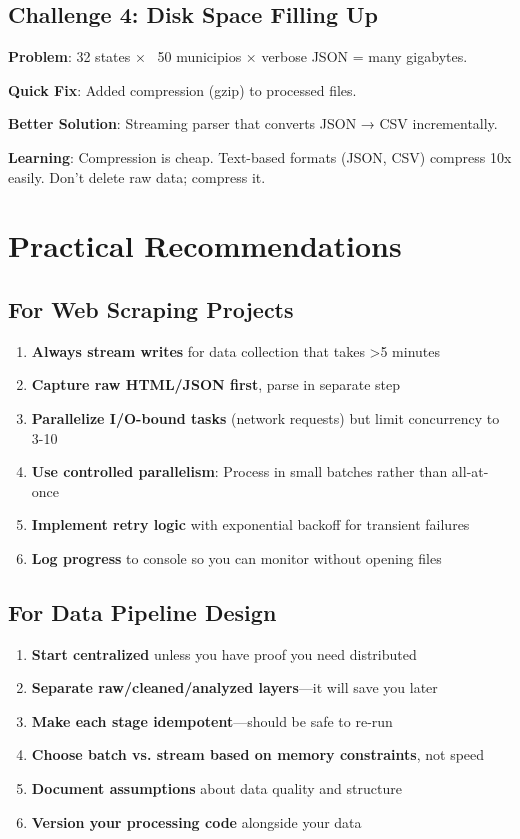 \documentclass[11pt,a4paper]{article}
\begin{document}
\subsection{Challenge 4: Disk Space Filling Up}

\textbf{Problem}: 32 states × ~50 municipios × verbose JSON = many gigabytes.

\textbf{Quick Fix}: Added compression (gzip) to processed files.

\textbf{Better Solution}: Streaming parser that converts JSON → CSV incrementally.

\textbf{Learning}: Compression is cheap. Text-based formats (JSON, CSV) compress 10x easily. Don't delete raw data; compress it.

\section{Practical Recommendations}

\subsection{For Web Scraping Projects}

\begin{enumerate}
    \item \textbf{Always stream writes} for data collection that takes >5 minutes
    \item \textbf{Capture raw HTML/JSON first}, parse in separate step
    \item \textbf{Parallelize I/O-bound tasks} (network requests) but limit concurrency to 3-10
    \item \textbf{Use controlled parallelism}: Process in small batches rather than all-at-once
    \item \textbf{Implement retry logic} with exponential backoff for transient failures
    \item \textbf{Log progress} to console so you can monitor without opening files
\end{enumerate}

\subsection{For Data Pipeline Design}

\begin{enumerate}
    \item \textbf{Start centralized} unless you have proof you need distributed
    \item \textbf{Separate raw/cleaned/analyzed layers}—it will save you later
    \item \textbf{Make each stage idempotent}—should be safe to re-run
    \item \textbf{Choose batch vs. stream based on memory constraints}, not speed
    \item \textbf{Document assumptions} about data quality and structure
    \item \textbf{Version your processing code} alongside your data
\end{enumerate}
\end{document}
